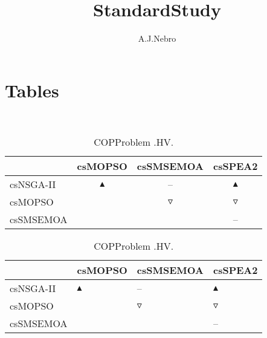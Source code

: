 \documentclass{article}
\title{StandardStudy}
\author{A.J.Nebro}
\begin{document}
\maketitle
\section{Tables}
\
\begin{table}
\caption{
COPProblem
.HV.}
\label{Table:
COPProblem
.HV.}
\centering
\begin{scriptsize}
\begin{tabular}{
lccc
}
\hline  & csMOPSO & csSMSEMOA & csSPEA2\\ 
\hline 
csNSGA-II
 & 
$\blacktriangle$
 & 
--
 & 
$\blacktriangle$
 \\ 
csMOPSO
 & 
  
 & 
$\triangledown$
 & 
$\triangledown$
 \\ 
csSMSEMOA
 & 
 
 & 
  
 & 
--
 \\ 
\hline
\end{tabular}
\end{scriptsize}
\end{table}
\begin{table}
\caption{
COPProblem 
.HV.}
\label{Table:
COPProblem 
.HV.}
\centering
\begin{scriptsize}
\begin{tabular}{
| l | p{0.15cm}   | p{0.15cm}   | p{0.15cm}   | 
}
\hline \multicolumn{1}{|c|}{} & \multicolumn{1}{c|}{csMOPSO} & \multicolumn{1}{c|}{csSMSEMOA} & \multicolumn{1}{c|}{csSPEA2} \\
\hline 
csNSGA-II
 & 
$\blacktriangle$
 & 
--
 & 
$\blacktriangle$
 \\ 
csMOPSO
 & 
  
 & 
$\triangledown$
 & 
$\triangledown$
 \\ 
csSMSEMOA
 & 
 
 & 
  
 & 
--
 \\ 
\hline
\end{tabular}
\end{scriptsize}
\end{table}
\end{document}
